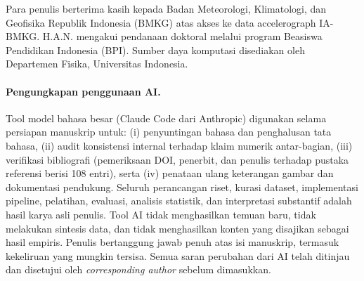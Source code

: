 \documentclass[10pt]{article}
\begin{document}
Para penulis berterima kasih kepada Badan Meteorologi, Klimatologi, dan
Geofisika Republik Indonesia (BMKG) atas akses ke data accelerograph
IA-BMKG. H.A.N. mengakui pendanaan doktoral melalui program Beasiswa
Pendidikan Indonesia (BPI). Sumber daya komputasi disediakan oleh
Departemen Fisika, Universitas Indonesia.

\paragraph{Pengungkapan penggunaan AI.}
Tool model bahasa besar (Claude Code dari Anthropic) digunakan selama
persiapan manuskrip untuk: (i) penyuntingan bahasa dan penghalusan tata
bahasa, (ii) audit konsistensi internal terhadap klaim numerik antar-bagian,
(iii) verifikasi bibliografi (pemeriksaan DOI, penerbit, dan penulis
terhadap pustaka referensi berisi 108 entri), serta (iv) penataan ulang
keterangan gambar dan dokumentasi pendukung. Seluruh perancangan riset,
kurasi dataset, implementasi pipeline, pelatihan, evaluasi, analisis
statistik, dan interpretasi substantif adalah hasil karya asli penulis.
Tool AI tidak menghasilkan temuan baru, tidak melakukan sintesis data,
dan tidak menghasilkan konten yang disajikan sebagai hasil empiris.
Penulis bertanggung jawab penuh atas isi manuskrip, termasuk kekeliruan
yang mungkin tersisa. Semua saran perubahan dari AI telah ditinjau dan
disetujui oleh \emph{corresponding author} sebelum dimasukkan.


\end{document}
